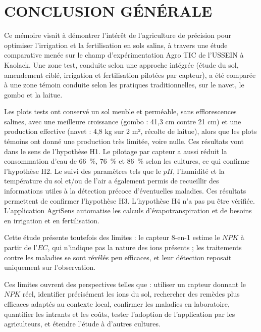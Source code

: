 \chapter*{CONCLUSION GÉNÉRALE}

Ce mémoire visait à démontrer l’intérêt de l’agriculture de précision pour optimiser l’irrigation et la fertilisation en sols salins, à travers une étude comparative menée sur le champ d’expérimentation Agro TIC de l’USSEIN à Kaolack. Une zone test, conduite selon une approche intégrée (étude du sol, amendement ciblé, irrigation et fertilisation pilotées par capteur), a été comparée à une zone témoin conduite selon les pratiques traditionnelles, sur le navet, le gombo et la laitue.

Les plots tests ont conservé un sol meuble et perméable, sans efflorescences salines, avec une meilleure croissance (gombo : 41,3 cm contre 21 cm) et une production effective (navet : 4,8 kg sur 2 m², récolte de laitue), alors que les plots témoins ont donné une production très limitée, voire nulle. Ces résultats vont dans le sens de l’hypothèse H1. Le pilotage par capteur a aussi réduit la consommation d’eau de 66~\%, 76~\% et 86~\% selon les cultures, ce qui confirme l’hypothèse H2. 
Le suivi des paramètres tels que le $pH$, l'humidité et la température du sol et/ou de l'air a également permis de recueillir des informations utiles à la détection précoce d'éventuelles maladies. Ces résultats permettent de confirmer l'hypothèse H3. L'hypothèse H4 n’a pas pu être vérifiée. L’application AgriSens automatise les calculs d’évapotranspiration et de besoins en irrigation et en fertilisation.

Cette étude présente toutefois des limites : le capteur 8-en-1 estime le $NPK$ à partir de l’$EC$, qui n’indique pas la nature des ions présents ; les traitements contre les maladies se sont révélés peu efficaces, et leur détection reposait uniquement sur l’observation.

Ces limites ouvrent des perspectives telles que : utiliser un capteur donnant le $NPK$ réel, identifier précisément les ions du sol, rechercher des remèdes plus efficaces adaptés au contexte local, confirmer les maladies en laboratoire, quantifier les intrants et les coûts, tester l’adoption de l’application par les agriculteurs, et étendre l’étude à d’autres cultures.